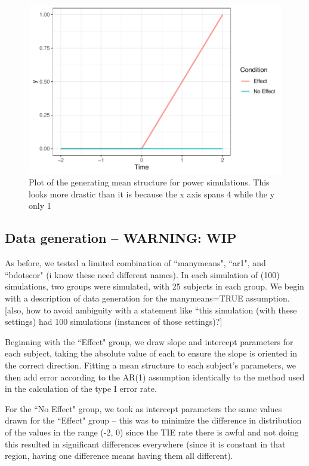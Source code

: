 \documentclass{article}
\begin{document}
\begin{figure}[H]
\centering
\includegraphics{power_plot.pdf}
\caption{Plot of the generating mean structure for power simulations. This looks more drastic than it is because the x axis spans 4 while the y only 1}
\label{fig:power_plot}
\end{figure}

\subsection{Data generation -- WARNING: WIP} As before, we tested a limited combination of ``manymeans", ``ar1", and ``bdotscor" (i know these need different names). In each simulation of (100) simulations, two groups were simulated, with 25 subjects in each group. We begin with a description of data generation for the manymeans=TRUE assumption. [also, how to avoid ambiguity with a statement like ``this simulation (with these settings) had 100 simulations (instances of those settings)?]

Beginning with the ``Effect" group, we draw slope and intercept parameters for each subject, taking the absolute value of each to ensure the slope is oriented in the correct direction. Fitting a mean structure to each subject's parameters, we then add error according to the AR(1) assumption identically to the method used in the calculation of the type I error rate.

For the ``No Effect" group, we took as intercept parameters the same values drawn for the ``Effect" group -- this was to minimize the difference in distribution of the values in the range (-2, 0) since the TIE rate there is awful and not doing this resulted in significant differences everywhere (since it is constant in that region, having one difference means having them all different). 
\end{document}
